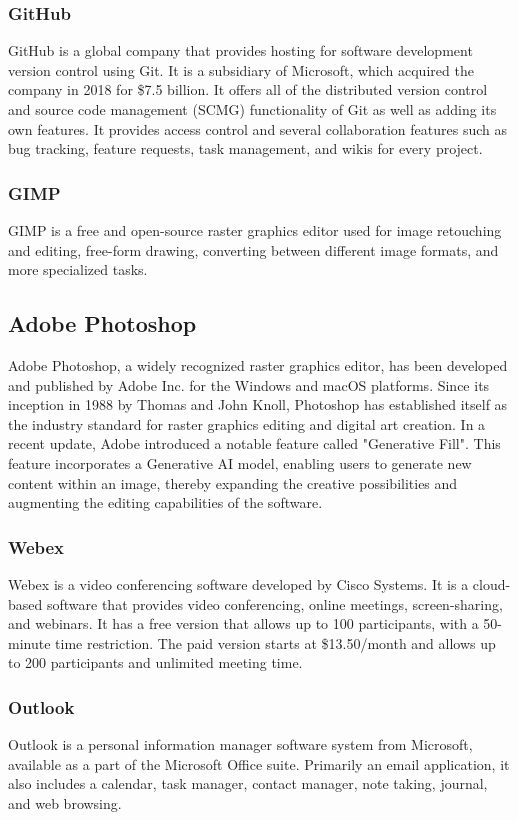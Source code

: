 \subsubsection{GitHub}\label{subsubsec:github}
GitHub is a global company that provides hosting for software development
version control using Git. It is a subsidiary of Microsoft, which acquired the
company in 2018 for \$7.5 billion. It offers all of the distributed version
control and source code management (\gls{SCMG}) functionality of Git as well as adding
its own features. It provides access control and several collaboration features
such as bug tracking, feature requests, task management, and wikis for every
project.
\subsubsection{GIMP}\label{subsubsec:gimp}
GIMP is a free and open-source raster graphics editor used for image retouching
and editing, free-form drawing, converting between different image formats, and
more specialized tasks.
\subsection{Adobe Photoshop}\label{subsec:adobe-photoshop}
Adobe Photoshop, a widely recognized raster graphics editor, has been developed and published by Adobe Inc. for the Windows and macOS platforms. 
Since its inception in 1988 by Thomas and John Knoll, Photoshop has established itself as the industry standard for raster graphics editing and digital art creation. 
In a recent update, Adobe introduced a notable feature called "Generative Fill". 
This feature incorporates a Generative AI model, enabling users to generate new content within an image, thereby expanding the creative possibilities and augmenting the editing capabilities of the software.
\subsubsection{Webex}\label{subsubsec:webex}
Webex is a video conferencing software developed by Cisco Systems. It is a
cloud-based software that provides video conferencing, online meetings,
screen-sharing, and webinars. It has a free version that allows up to 100
participants, with a 50-minute time restriction. The paid version starts at
\$13.50/month and allows up to 200 participants and unlimited meeting time.
\subsubsection{Outlook}\label{subsubsec:outlook}
Outlook is a personal information manager software system from Microsoft,
available as a part of the Microsoft Office suite. Primarily an email
application, it also includes a calendar, task manager, contact manager,
note taking, journal, and web browsing.

